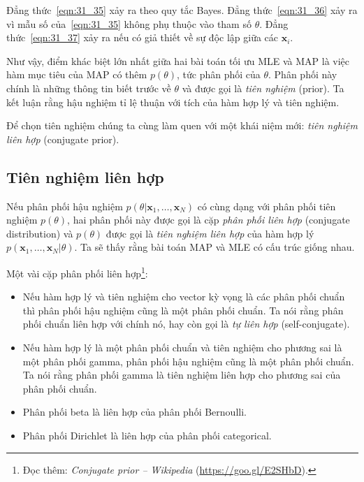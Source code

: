 Đẳng thức~\eqref{eqn:31_35} xảy ra theo quy tắc Bayes. Đẳng
thức~\eqref{eqn:31_36} xảy ra vì mẫu số của~\eqref{eqn:31_35} không phụ thuộc vào
tham số $\theta$. Đẳng thức~\eqref{eqn:31_37} xảy ra nếu có giả thiết về
sự độc lập giữa các $\mathbf{x}_i$. 


Như vậy, điểm khác biệt lớn nhất giữa hai bài toán tối ưu MLE và MAP là việc hàm
mục tiêu của MAP có thêm $p(\theta)$, tức phân phối của $\theta$. Phân phối này
chính là những thông tin biết trước về $\theta$ và được gọi là
\textit{tiên nghiệm} (prior). Ta kết luận rằng hậu nghiệm tỉ lệ thuận với
tích của hàm hợp lý và tiên nghiệm.
 

Để chọn tiên nghiệm chúng ta cùng làm quen với một khái
niệm mới: \textit{tiên nghiệm liên hợp} (conjugate prior). 
 
 
\subsection{Tiên nghiệm liên hợp}
Nếu phân phối hậu nghiệm $p(\theta | \mathbf{x}_1, \dots,
\mathbf{x}_N)$ có cùng dạng với phân phối tiên nghiệm $p(\theta)$, hai phân phối này được gọi là cặp \textit{phân phối liên hợp} (conjugate distribution) và $p(\theta)$ được
gọi là \textit{tiên nghiệm liên hợp} của hàm hợp lý $p(\mathbf{x}_1, \dots,
\mathbf{x}_N | \theta)$. Ta sẽ thấy rằng bài toán MAP và MLE có cấu trúc giống nhau. 
 

Một vài cặp phân phối liên hợp\footnote{Đọc thêm:
\textit{Conjugate prior -- Wikipedia} (\url{https://goo.gl/E2SHbD}).}:

\begin{itemize}
    \item Nếu hàm hợp lý và tiên nghiệm cho vector kỳ vọng là các phân phối
    chuẩn thì phân phối hậu nghiệm cũng là một phân phối chuẩn. Ta nói rằng phân
    phối chuẩn liên hợp với chính nó, hay còn gọi là \textit{tự liên hợp} (self-conjugate).
     
    \item Nếu hàm hợp lý là một phân phối chuẩn và tiên nghiệm
    cho phương sai là một {phân phối gamma}, phân phối hậu nghiệm cũng là một phân phối chuẩn. Ta nói rằng phân phối gamma là tiên nghiệm liên hợp cho phương sai của phân phối chuẩn. 
     
    \item Phân phối beta là liên hợp của phân phối Bernoulli.
     
    \item Phân phối Dirichlet là liên hợp của phân phối categorical.
 
\end{itemize}
 
